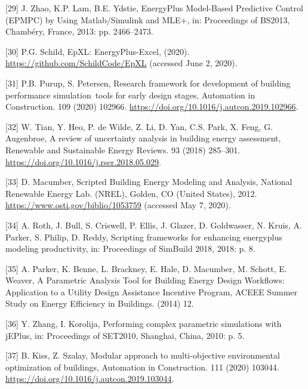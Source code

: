 \documentclass[3p, times]{elsarticle} %
\begin{document}
\leavevmode\hypertarget{ref-Zhao2013b}{}%
{[}29{]} J. Zhao, K.P. Lam, B.E. Ydstie, EnergyPlus Model-Based Predictive Control (EPMPC) by Using Matlab/Simulink and MLE+, in: Proceedings of BS2013, Chambéry, France, 2013: pp. 2466--2473.

\leavevmode\hypertarget{ref-Schild2020}{}%
{[}30{]} P.G. Schild, EpXL: EnergyPlus-Excel, (2020). \url{https://github.com/SchildCode/EpXL} (accessed June 2, 2020).

\leavevmode\hypertarget{ref-Purup2020}{}%
{[}31{]} P.B. Purup, S. Petersen, Research framework for development of building performance simulation~tools for early design stages, Automation in Construction. 109 (2020) 102966. \url{https://doi.org/10.1016/j.autcon.2019.102966}.

\leavevmode\hypertarget{ref-Tian2018review}{}%
{[}32{]} W. Tian, Y. Heo, P. de Wilde, Z. Li, D. Yan, C.S. Park, X. Feng, G. Augenbroe, A review of uncertainty analysis in building energy assessment, Renewable and Sustainable Energy Reviews. 93 (2018) 285--301. \url{https://doi.org/10.1016/j.rser.2018.05.029}.

\leavevmode\hypertarget{ref-Macumber2012}{}%
{[}33{]} D. Macumber, Scripted Building Energy Modeling and Analysis, National Renewable Energy Lab. (NREL), Golden, CO (United States), 2012. \url{https://www.osti.gov/biblio/1053759} (accessed May 7, 2020).

\leavevmode\hypertarget{ref-Roth2018}{}%
{[}34{]} A. Roth, J. Bull, S. Criswell, P. Ellis, J. Glazer, D. Goldwasser, N. Kruis, A. Parker, S. Philip, D. Reddy, Scripting frameworks for enhancing energyplus modeling productivity, in: Proceedings of SimBuild 2018, 2018: p. 8.

\leavevmode\hypertarget{ref-Parker2014}{}%
{[}35{]} A. Parker, K. Benne, L. Brackney, E. Hale, D. Macumber, M. Schott, E. Weaver, A Parametric Analysis Tool for Building Energy Design Workflows: Application to a Utility Design Assistance Incentive Program, ACEEE Summer Study on Energy Efficiency in Buildings. (2014) 12.

\leavevmode\hypertarget{ref-Zhang2010a}{}%
{[}36{]} Y. Zhang, I. Korolija, Performing complex parametric simulations with jEPlus, in: Proceedings of SET2010, Shanghai, China, 2010: p. 5.

\leavevmode\hypertarget{ref-Kiss2020}{}%
{[}37{]} B. Kiss, Z. Szalay, Modular approach to multi-objective environmental optimization of buildings, Automation in Construction. 111 (2020) 103044. \url{https://doi.org/10.1016/j.autcon.2019.103044}.
\end{document}
